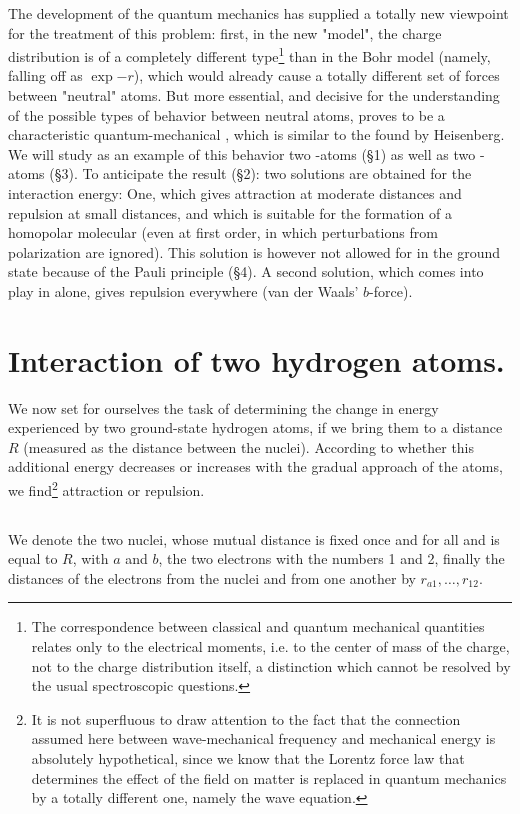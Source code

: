 \begin{paper}{1}
The development of the quantum mechanics has supplied a totally new viewpoint for the treatment of this problem: first, in the new "model", the charge distribution is of a completely different type\footnote{The correspondence between classical and quantum mechanical quantities relates only to the electrical moments, i.e. to the center of mass of the charge, not to the charge distribution itself, a distinction which cannot be resolved by the usual spectroscopic questions.} than in the Bohr model (namely, falling off as $\exp{-r}$), which would already cause a totally different set of forces between "neutral" atoms. But more essential, and decisive for the understanding of the possible types of behavior between neutral atoms, proves to be a characteristic quantum-mechanical , which is similar to the  found by Heisenberg. We will study as an example of this behavior two -atoms (\S1) as well as two -atoms (\S3). To anticipate the result (\S2): two solutions are obtained for the interaction energy: One, which gives attraction at moderate distances and repulsion at small distances, and which is suitable for the formation of a homopolar molecular (even at first order, in which perturbations from polarization are ignored). This solution is however not allowed for  in the ground state because of the Pauli principle (\S4). A second solution, which comes into play in  alone, gives repulsion everywhere (van der Waals' $b$-force).

\section{Interaction of two hydrogen atoms.} We now set for ourselves the task of determining the change in energy experienced by two ground-state hydrogen atoms, if we bring them to a distance $R$ (measured as the distance between the nuclei). According to whether this additional energy decreases or increases with the gradual approach of the atoms, we find\footnote{It is not superfluous to draw attention to the fact that the connection assumed here between wave-mechanical frequency and mechanical energy is absolutely hypothetical, since we know that the Lorentz force law that determines the effect of the field on matter is replaced in quantum mechanics by a totally different one, namely the wave equation.} attraction or repulsion.

\subsection{} We denote the two nuclei, whose mutual distance is fixed once and for all and is equal to $R$, with $a$ and $b$, the two electrons with the numbers 1 and 2, finally the distances of the electrons from the nuclei and from one another by $r_{a1}, \dots, r_{12}$.


\end{paper}
